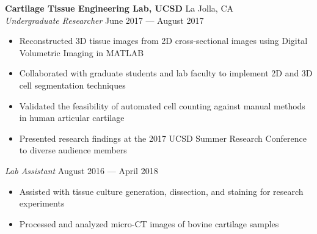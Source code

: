 \documentclass{article}
\begin{document}
\textbf{Cartilage Tissue Engineering Lab, UCSD} \hfill La Jolla, CA\\
\textit{Undergraduate Researcher} \hfill June 2017 --- August 2017\\
\vspace{-2mm}
\begin{itemize} \itemsep 0.05pt
	\item Reconstructed 3D tissue images from 2D cross-sectional images using Digital Volumetric Imaging in MATLAB
	\item Collaborated with graduate students and lab faculty to implement 2D and 3D cell segmentation techniques
	\item Validated the feasibility of automated cell counting against manual methods in human articular cartilage
	\item Presented research findings at the 2017 UCSD Summer Research Conference to diverse audience members
\end{itemize}


\textit{Lab Assistant} \hfill August 2016 --- April 2018\\
\vspace{-2mm}
\begin{itemize} \itemsep 0.05pt
	\item Assisted with tissue culture generation, dissection, and staining for research experiments
	\item Processed and analyzed micro-CT images of bovine cartilage samples
\end{itemize}
\end{document}
